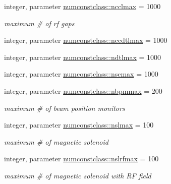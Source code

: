 \begin{DoxyCompactItemize}
integer, parameter \mbox{\hyperlink{namespacenumconstclass_ad4189a0ff5d1f4848364ea3012cddfd0}{numconstclass\+::ncclmax}} = 1000
\begin{DoxyCompactList}\small\item\em maximum \# of rf gaps \end{DoxyCompactList}\item 
integer, parameter \mbox{\hyperlink{namespacenumconstclass_a27ee6b57f509d99358609230f3ea289a}{numconstclass\+::nccdtlmax}} = 1000
\item 
integer, parameter \mbox{\hyperlink{namespacenumconstclass_a36b8673b359ee1e52cd37349ec8e51ad}{numconstclass\+::ndtlmax}} = 1000
\item 
integer, parameter \mbox{\hyperlink{namespacenumconstclass_a842fc257d326a7d9ec49e681832e6aa3}{numconstclass\+::nscmax}} = 1000
\item 
integer, parameter \mbox{\hyperlink{namespacenumconstclass_a2a11d40986bf0aa3873c57eccd9cdfac}{numconstclass\+::nbpmmax}} = 200
\begin{DoxyCompactList}\small\item\em maximum \# of beam position monitors \end{DoxyCompactList}\item 
integer, parameter \mbox{\hyperlink{namespacenumconstclass_a538bae3eec1dd1a5815019847df66e23}{numconstclass\+::nslmax}} = 100
\begin{DoxyCompactList}\small\item\em maximum \# of magnetic solenoid \end{DoxyCompactList}\item 
integer, parameter \mbox{\hyperlink{namespacenumconstclass_a454ee9bf5d3755b8cfc222eedcb9495d}{numconstclass\+::nslrfmax}} = 100
\begin{DoxyCompactList}\small\item\em maximum \# of magnetic solenoid with RF field \end{DoxyCompactList}\end{DoxyCompactItemize}
\textbf{ }\par
